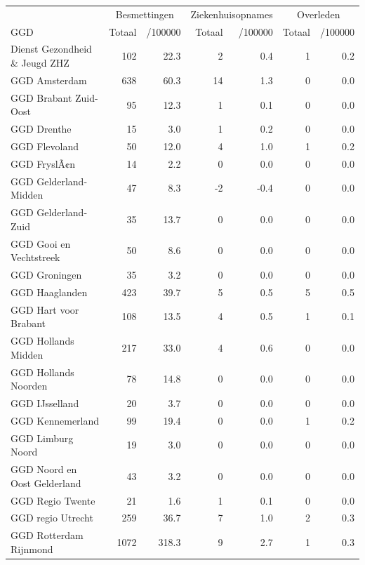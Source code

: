 \documentclass[
  english,
  man,floatsintext]{apa6}
\begin{document}
\begin{table}[H]
\centering\begingroup\fontsize{10}{12}\selectfont

\begin{threeparttable}
\begin{tabular}{lrrrrrr}
\toprule
\multicolumn{1}{c}{ } & \multicolumn{2}{c}{Besmettingen} & \multicolumn{2}{c}{Ziekenhuisopnames} & \multicolumn{2}{c}{Overleden} \\
\cmidrule(l{3pt}r{3pt}){2-3} \cmidrule(l{3pt}r{3pt}){4-5} \cmidrule(l{3pt}r{3pt}){6-7}
GGD & Totaal & /100000 & Totaal & /100000 & Totaal & /100000\\
\midrule
Dienst Gezondheid \& Jeugd ZHZ & 102 & 22.3 & 2 & 0.4 & 1 & 0.2\\
GGD Amsterdam & 638 & 60.3 & 14 & 1.3 & 0 & 0.0\\
GGD Brabant Zuid-Oost & 95 & 12.3 & 1 & 0.1 & 0 & 0.0\\
GGD Drenthe & 15 & 3.0 & 1 & 0.2 & 0 & 0.0\\
GGD Flevoland & 50 & 12.0 & 4 & 1.0 & 1 & 0.2\\
GGD FryslÃ¢n & 14 & 2.2 & 0 & 0.0 & 0 & 0.0\\
GGD Gelderland-Midden & 47 & 8.3 & -2 & -0.4 & 0 & 0.0\\
GGD Gelderland-Zuid & 35 & 13.7 & 0 & 0.0 & 0 & 0.0\\
GGD Gooi en Vechtstreek & 50 & 8.6 & 0 & 0.0 & 0 & 0.0\\
GGD Groningen & 35 & 3.2 & 0 & 0.0 & 0 & 0.0\\
GGD Haaglanden & 423 & 39.7 & 5 & 0.5 & 5 & 0.5\\
GGD Hart voor Brabant & 108 & 13.5 & 4 & 0.5 & 1 & 0.1\\
GGD Hollands Midden & 217 & 33.0 & 4 & 0.6 & 0 & 0.0\\
GGD Hollands Noorden & 78 & 14.8 & 0 & 0.0 & 0 & 0.0\\
GGD IJsselland & 20 & 3.7 & 0 & 0.0 & 0 & 0.0\\
GGD Kennemerland & 99 & 19.4 & 0 & 0.0 & 1 & 0.2\\
GGD Limburg Noord & 19 & 3.0 & 0 & 0.0 & 0 & 0.0\\
GGD Noord en Oost Gelderland & 43 & 3.2 & 0 & 0.0 & 0 & 0.0\\
GGD Regio Twente & 21 & 1.6 & 1 & 0.1 & 0 & 0.0\\
GGD regio Utrecht & 259 & 36.7 & 7 & 1.0 & 2 & 0.3\\
GGD Rotterdam Rijnmond & 1072 & 318.3 & 9 & 2.7 & 1 & 0.3\\

\end{tabular}
\end{threeparttable}
\end{table}
\end{document}
